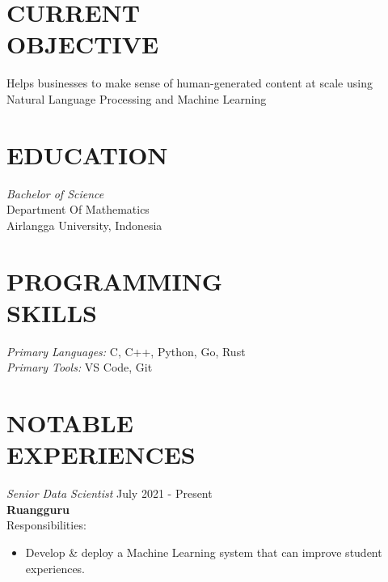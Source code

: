 \documentclass[margin, 10pt]{res} %
\begin{document}
\begin{resume}

 \section{CURRENT\\OBJECTIVE}

Helps businesses to make sense of human-generated content at scale using Natural Language Processing
and Machine Learning


\section{EDUCATION}

{\sl Bachelor of Science} \\
Department Of Mathematics \\
Airlangga University, Indonesia


\section{PROGRAMMING\\ SKILLS}

{\sl Primary Languages:} C, C++, Python, Go, Rust \\
{\sl Primary Tools:} VS Code, Git


\section{NOTABLE\\EXPERIENCES}
{\sl Senior Data Scientist} \hfill July 2021 - Present \\
\textbf{Ruangguru} \\
Responsibilities:
\begin{itemize} \itemsep -2pt %
\item Develop & deploy a Machine Learning system that can improve student experiences.
\end{itemize}


\end{resume}
\end{document}
